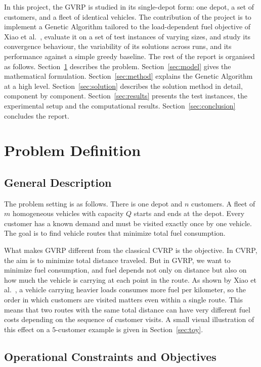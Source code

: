\documentclass [a4paper, 11pt, titlepage] {article}
\begin{document}
In this project, the GVRP is studied in its single-depot form: one depot, a set of customers, and a fleet of identical vehicles. The contribution of the project is to implement a Genetic Algorithm tailored to the load-dependent fuel objective of Xiao et al.\ \cite{xiao2012}, evaluate it on a set of test instances of varying sizes, and study its convergence behaviour, the variability of its solutions across runs, and its performance against a simple greedy baseline. The rest of the report is organised as follows. Section~\ref{sec:problem} describes the problem. Section~\ref{sec:model} gives the mathematical formulation. Section~\ref{sec:method} explains the Genetic Algorithm at a high level. Section~\ref{sec:solution} describes the solution method in detail, component by component. Section~\ref{sec:results} presents the test instances, the experimental setup and the computational results. Section~\ref{sec:conclusion} concludes the report.

\section{Problem Definition}
\label{sec:problem}

\subsection{General Description}

The problem setting is as follows. There is one depot and $n$ customers. A fleet of $m$ homogeneous vehicles with capacity $Q$ starts and ends at the depot. Every customer has a known demand and must be visited exactly once by one vehicle. The goal is to find vehicle routes that minimize total fuel consumption.

What makes GVRP different from the classical CVRP is the objective. In CVRP, the aim is to minimize total distance traveled. But in GVRP, we want to minimize fuel consumption, and fuel depends not only on distance but also on how much the vehicle is carrying at each point in the route. As shown by Xiao et al.\ \cite{xiao2012}, a vehicle carrying heavier loads consumes more fuel per kilometer, so the order in which customers are visited matters even within a single route. This means that two routes with the same total distance can have very different fuel costs depending on the sequence of customer visits. A small visual illustration of this effect on a $5$-customer example is given in Section~\ref{sec:toy}.

\subsection{Operational Constraints and Objectives}
\end{document}
